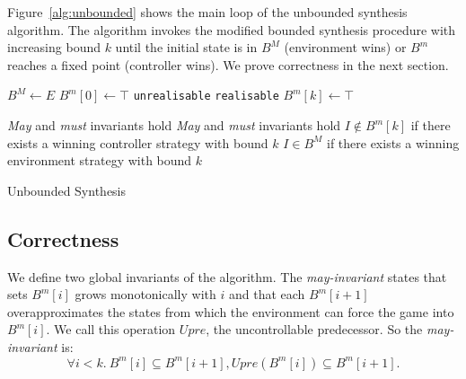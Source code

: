 \documentclass{llncs}
\begin{document}
Figure~\ref{alg:unbounded} shows the main loop of the unbounded synthesis algorithm.
The algorithm invokes the modified bounded synthesis procedure with increasing bound $k$
until the initial state is in $B^M$ (environment wins) or $B^m$ reaches a fixed point 
(controller wins). We prove correctness in the next section.

\begin{algorithm}[h]
    \begin{algorithmic}[1]
            \State $B^M \gets E$
            \State $B^m[0] \gets \top$
                    \Return \texttt{unrealisable} 
                \EndIIf
                    \Return \texttt{realisable} 
                \EndIIf
                \State $B^m[k] \gets \top$
                \State {}
            \EndFor
        \EndFunction
    \end{algorithmic}

    \begin{algorithmic}
        \Require \emph{May} and \emph{must} invariants hold
        \Ensure \emph{May} and \emph{must} invariants hold
        \Ensure $I \not\in B^m[k]$ if there exists a winning controller strategy with bound $k$
        \Ensure $I \in B^M$ if there exists a winning environment strategy with bound $k$
            \State \Return {}
        \EndFunction
    \end{algorithmic}
    \caption{Unbounded Synthesis}
    \label{alg:unbounded}
\end{algorithm}



\subsection{Correctness}


We define two global invariants of the algorithm.  The \emph{may-invariant}
states that sets $B^m[i]$ grows monotonically with $i$ and that each $B^m[i+1]$
overapproximates the states from which the environment can force the game into
$B^m[i]$. We call this operation $Upre$, the uncontrollable predecessor. So the
\emph{may-invariant} is: $$\forall i<k.~B^m[i] \subseteq B^m[i+1], Upre(B^m[i])
\subseteq B^m[i+1].$$
\end{document}
